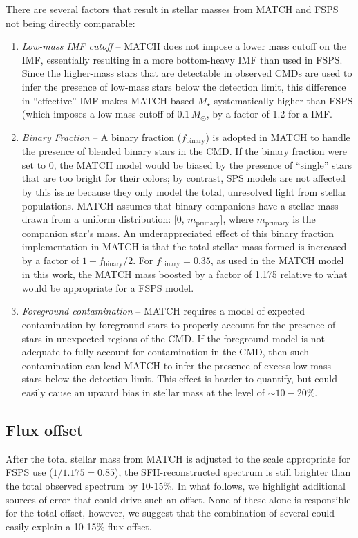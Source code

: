 \documentclass[preprint2]{aastex62}
\begin{document}
There are several factors that result in stellar masses from MATCH and FSPS not being directly comparable:
\begin{enumerate}
\item \textit{Low-mass IMF cutoff} -- MATCH does not impose a lower mass cutoff on the IMF, essentially resulting in a more bottom-heavy IMF than used in FSPS. Since the higher-mass stars that are detectable in observed CMDs are used to infer the presence of low-mass stars below the detection limit, this difference in ``effective'' IMF makes MATCH-based $M_\star$ systematically higher than FSPS (which imposes a low-mass cutoff of $0.1 \,M_\odot$, by a factor of 1.2 for a \citet{kroupa01} IMF. 
\item \textit{Binary Fraction} -- A binary fraction ($f_\mathrm{binary}$) is adopted in MATCH to handle the presence of blended binary stars in the CMD. If the binary fraction were set to 0, the MATCH model would be biased by the presence of ``single'' stars that are too bright for their colors; by contrast, SPS models are not affected by this issue because they only model the total, unresolved light from stellar populations. MATCH assumes that binary companions have a stellar mass drawn from a uniform distribution: [0, $m_\mathrm{primary}$], where $m_\mathrm{primary}$ is the companion star's mass. An underappreciated effect of this binary fraction implementation in MATCH is that the total stellar mass formed is increased by a factor of $1 + f_\mathrm{binary} / 2$. For $f_\mathrm{binary}=0.35$, as used in the MATCH model in this work, the MATCH mass boosted by a factor of 1.175 relative to what would be appropriate for a FSPS model.
\item \textit{Foreground contamination} -- MATCH requires a model of expected contamination by foreground stars to properly account for the presence of stars in unexpected regions of the CMD. If the foreground model is not adequate to fully account for contamination in the CMD, then such contamination can lead MATCH to infer the presence of excess low-mass stars below the detection limit. This effect is harder to quantify, but could easily cause an upward bias in stellar mass at the level of $\sim10-20\%$.
\end{enumerate}

\subsection{Flux offset}\label{sec:discussion:offset}

After the total stellar mass from MATCH is adjusted to the scale appropriate for FSPS use ($1/1.175 = 0.85$), the SFH-reconstructed spectrum is still brighter than the total observed spectrum by 10-15\%. In what follows, we highlight additional sources of error that could drive such an offset. None of these alone is responsible for the total offset, however, we suggest that the combination of several could easily explain a 10-15\% flux offset.
\end{document}
